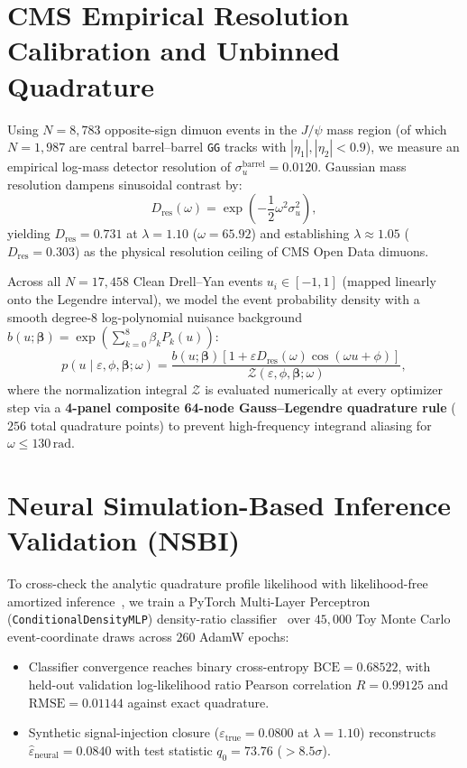 \section{CMS Empirical Resolution Calibration and Unbinned Quadrature}
Using $N = 8,783$ opposite-sign dimuon events in the $J/\psi$ mass region (of which $N = 1,987$ are central barrel--barrel \texttt{GG} tracks with $|\eta_1|, |\eta_2| < 0.9$), we measure an empirical log-mass detector resolution of $\sigma_u^{\mathrm{barrel}} = 0.0120$. Gaussian mass resolution dampens sinusoidal contrast by:
\begin{equation}
D_{\mathrm{res}}(\omega) = \exp\!\left(-\frac{1}{2}\omega^2 \sigma_u^2\right),
\end{equation}
yielding $D_{\mathrm{res}} = 0.731$ at $\lambda = 1.10$ ($\omega = 65.92$) and establishing $\lambda \approx 1.05$ ($D_{\mathrm{res}} = 0.303$) as the physical resolution ceiling of CMS Open Data dimuons.

Across all $N = 17,458$ Clean Drell--Yan events $u_i \in [-1, 1]$ (mapped linearly onto the Legendre interval), we model the event probability density with a smooth degree-8 log-polynomial nuisance background $b(u;\boldsymbol{\beta}) = \exp\!\left(\sum_{k=0}^8 \beta_k P_k(u)\right)$:
\begin{equation}
p(u \mid \varepsilon, \phi, \boldsymbol{\beta}; \omega) = \frac{b(u;\boldsymbol{\beta})\left[1 + \varepsilon D_{\mathrm{res}}(\omega)\cos(\omega u + \phi)\right]}{\mathcal{Z}(\varepsilon, \phi, \boldsymbol{\beta}; \omega)},
\end{equation}
where the normalization integral $\mathcal{Z}$ is evaluated numerically at every optimizer step via a \textbf{4-panel composite 64-node Gauss--Legendre quadrature rule} ($256$ total quadrature points) to prevent high-frequency integrand aliasing for $\omega \le 130\,\mathrm{rad}$.

\section{Neural Simulation-Based Inference Validation (NSBI)}
To cross-check the analytic quadrature profile likelihood with likelihood-free amortized inference~\cite{cranmer2020}, we train a PyTorch Multi-Layer Perceptron (\texttt{ConditionalDensityMLP}) density-ratio classifier~\cite{wilks1938} over $45,000$ Toy Monte Carlo event-coordinate draws across $260$ AdamW epochs:
\begin{itemize}
    \item Classifier convergence reaches binary cross-entropy $\mathrm{BCE} = 0.68522$, with held-out validation log-likelihood ratio Pearson correlation $R = 0.99125$ and $\mathrm{RMSE} = 0.01144$ against exact quadrature.
    \item Synthetic signal-injection closure ($\varepsilon_{\mathrm{true}} = 0.0800$ at $\lambda = 1.10$) reconstructs $\hat\varepsilon_{\mathrm{neural}} = 0.0840$ with test statistic $q_0 = 73.76$ ($> 8.5\sigma$).
\end{itemize}

